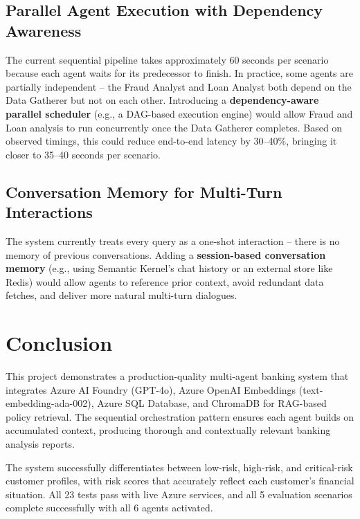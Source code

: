 \documentclass[12pt,a4paper]{article}
\begin{document}
\subsection{Parallel Agent Execution with Dependency Awareness}

The current sequential pipeline takes approximately 60 seconds per scenario
because each agent waits for its predecessor to finish. In practice, some
agents are partially independent -- the Fraud Analyst and Loan Analyst both
depend on the Data Gatherer but not on each other. Introducing a
\textbf{dependency-aware parallel scheduler} (e.g., a DAG-based execution engine)
would allow Fraud and Loan analysis to run concurrently once the Data
Gatherer completes. Based on observed timings, this could reduce end-to-end
latency by 30--40\%, bringing it closer to 35--40 seconds per scenario.

\subsection{Conversation Memory for Multi-Turn Interactions}

The system currently treats every query as a one-shot interaction -- there is
no memory of previous conversations. Adding a \textbf{session-based conversation
memory} (e.g., using Semantic Kernel's chat history or an external store like
Redis) would allow agents to reference prior context, avoid redundant data
fetches, and deliver more natural multi-turn dialogues.

\section{Conclusion}

This project demonstrates a production-quality multi-agent banking system
that integrates Azure AI Foundry (GPT-4o), Azure OpenAI Embeddings
(text-embedding-ada-002), Azure SQL Database, and ChromaDB for RAG-based
policy retrieval. The sequential orchestration pattern ensures each agent
builds on accumulated context, producing thorough and contextually relevant
banking analysis reports.

The system successfully differentiates between low-risk, high-risk, and
critical-risk customer profiles, with risk scores that accurately reflect
each customer's financial situation. All 23 tests pass with live Azure
services, and all 5 evaluation scenarios complete successfully with all 6
agents activated.
\end{document}

